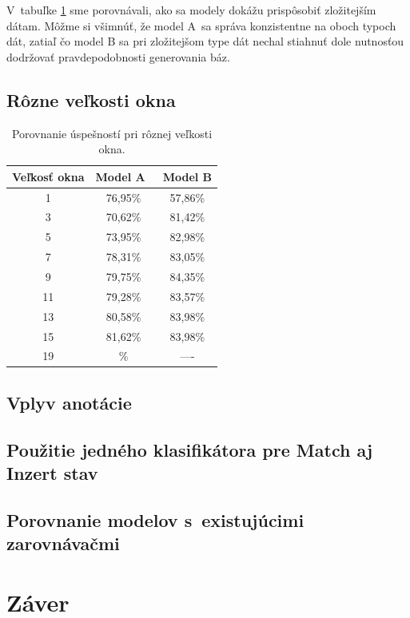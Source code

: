 V~tabuľke \ref{tab:success-compare} sme porovnávali, ako sa modely dokážu prispôsobiť zložitejším dátam. Môžme si všimnúť, že model A~sa správa konzistentne na oboch typoch dát, zatiaľ čo model B sa pri zložitejšom type dát nechal stiahnuť dole nutnosťou dodržovať pravdepodobnosti generovania báz.

\subsection{Rôzne veľkosti okna}

\begin{table}[htp]
\centering
\begin{tabular}{c|cc}
Veľkosť okna & Model A~& Model B\\
\hline
1 & 76,95\% & 57,86\%\\
3 & 70,62\% & 81,42\%\\
5 & 73,95\% & 82,98\%\\
7 & 78,31\% & 83,05\%\\
9 & 79,75\% & 84,35\%\\
11 & 79,28\% & 83,57\%\\
13 & 80,58\% & 83,98\%\\
15 & 81,62\% & 83,98\%\\
19 & \% & ----\\
\end{tabular}
\caption[Porovnanie úspešností pri rôznej veľkosti okna]{Porovnanie úspešností pri rôznej veľkosti okna. }
\label{tab:success-compare}
\end{table}

\subsection{Vplyv anotácie}

\subsection{Použitie jedného klasifikátora pre Match aj Inzert stav}

\subsection{Porovnanie modelov s~existujúcimi zarovnávačmi}

\section{Záver}

